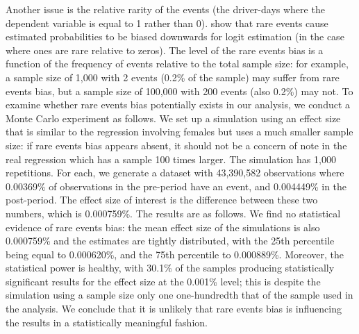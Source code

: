 Another issue is the relative rarity of the events 
(the driver-days where the dependent variable is equal to 1 rather than 0). 
\citet{kingzheng2001}
show that rare events cause estimated probabilities to be biased downwards for logit estimation 
(in the case where ones are rare relative to zeros). 
The level of the rare events bias is a function of 
the frequency of events relative to the total sample size: 
for example, a sample size of 1,000 with 2 events (0.2\% of the sample) 
may suffer from rare events bias, 
but a sample size of 100,000 with 200 events (also 0.2\%) may not. 
To examine whether rare events bias potentially exists in our analysis, 
we conduct a Monte Carlo experiment as follows. 
We set up a simulation using an effect size that is similar to the regression involving females but uses a much smaller sample size: 
if rare events bias appears absent, 
it should not be a concern of note in the real regression 
which has a sample 100 times larger. 
The simulation has 1,000 repetitions. 
For each, we generate a dataset with 43,390,582 observations 
where 0.00369\% of observations in the pre-period have an event, 
and 0.004449\% in the post-period. 
The effect size of interest is the difference between these two numbers, which is 0.000759\%. 
The results are as follows. 
We find no statistical evidence of rare events bias: 
the mean effect size of the simulations is also 0.000759\% 
and the estimates are tightly distributed, 
with the 25th percentile being equal to 0.000620\%, 
and the 75th percentile to 0.000889\%. 
Moreover, the statistical power is healthy, 
with 30.1\% of the samples producing statistically significant results 
for the effect size at the 0.001\% level; 
this is despite the simulation using a sample size only one one-hundredth 
that of the sample used in the analysis. 
We conclude that it is unlikely that rare events bias 
is influencing the results in a statistically meaningful fashion.




